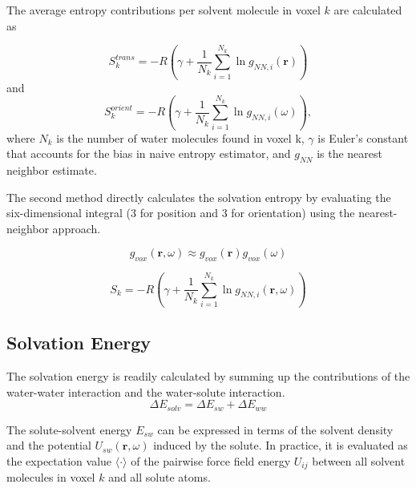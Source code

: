 \documentclass[9pt,tutorial]{livecoms}
\begin{document}
The average entropy contributions per solvent molecule in voxel $k$ are calculated as

\begin{equation}
	S_{k}^\textit{trans} = -R \left( \gamma + \frac{1}{N_\textit{k}} \sum _{i=1}^{N_k} \ln g_{NN, \textit{i}}(\textbf{r}) \right)
\end{equation}
and
\begin{equation}

	S_{k}^\textit{orient} = -R \left( \gamma + \frac{1}{N_k} \sum _{i=1}^{N_k} \ln g_{NN, i}(\omega) \right)
	,

\end{equation}
where $N_\textit{k}$ is the number of water molecules found in voxel k, $\gamma$ is Euler's constant that accounts for the bias in naive entropy estimator, and $g_\textit{NN}$ is the nearest neighbor estimate.

The second method directly calculates the solvation entropy by evaluating the six-dimensional integral (3 for position and 3 for orientation) 
using the nearest-neighbor approach. 

\begin{equation}
g_\textit{vox} \left( \textbf{r}, \omega \right) \approx g_\textit{vox}(\textbf{r}) g_\textit{vox}(\omega)
\end{equation}

\begin{equation}

	S_\textit{k} = -R \left( \gamma + \frac{1}{N_\textit{k}} \sum _{i=1}^{N_k} \ln g_{NN, \textit{i}}(\textbf{r},\omega) \right)

\end{equation}


\subsection{Solvation Energy}
The solvation energy is readily calculated by summing up the contributions of the water-water interaction and the water-solute interaction.
\begin{equation}
	\Delta E_\textit{solv} = \Delta E_\textit{sw} + \Delta E_\textit{ww}
\end{equation}

The solute-solvent energy $E_{sw}$ can be expressed in terms of the solvent density and the potential $U_{sw}(\textbf{r},\omega)$ induced by the solute.
In practice, it is evaluated as the expectation value $\langle\cdot\rangle$ of the pairwise force field energy $U_{ij}$ between all solvent molecules in voxel $k$ and all solute atoms.
\end{document}
